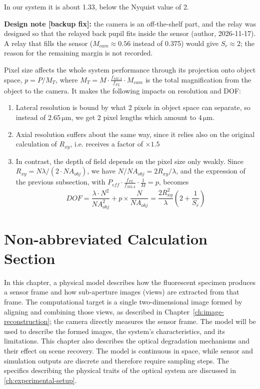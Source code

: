 In our system it is about 1.33, below the Nyquist value of 2.

\textbf{Design note [backup fix]: } the camera is an off-the-shelf part, and the relay was designed so that the relayed back pupil fits inside the sensor (author, 2026-11-17). A relay that fills the sensor ($M_{cam}\approx 0.56$ instead of 0.375) would give $S_r\approx 2$; the reason for the remaining margin is not recorded.

Pixel size affects the whole system performance through its projection onto object space, $p=P/M_T$, where $M_T=M\cdot\frac{f_{MLA}}{f_{FL}}\cdot M_{cam}$ is the total magnification from the object to the camera. It makes the following impacts on resolution and DOF:
\begin{enumerate}
    \item Lateral resolution is bound by what 2 pixels in object space can separate, so instead of $2.65\,\mathrm{\mu m}$, we get 2 pixel lengths which amount to $4\,\mathrm{\mu m}$.
    \item Axial resolution suffers about the same way, since it relies also on the original calculation of $R_{xy}$, i.e. receives a factor of $\times 1.5$
    \item In contrast, the depth of field depends on the pixel size only weakly. Since $R_{xy}=N\lambda/(2\cdot NA_{obj})$, we have $N/NA_{obj}=2R_{xy}/\lambda$, and the expression of the previous subsection, with $P_{eff}\cdot\frac{f_{FL}}{f_{MLA}}\cdot\frac{1}{M}=p$, becomes
    \begin{equation}
        DOF=\frac{\lambda\cdot N^2}{NA_{obj}^2}+p\times\frac{N}{NA_{obj}}=\frac{2R_{xy}^2}{\lambda}\left(2+\frac{1}{S_r}\right)
    \end{equation}
\end{enumerate}

\section{Non-abbreviated Calculation Section}
In this chapter, a physical model describes how the fluorescent specimen produces a sensor frame and how sub-aperture images (views) are extracted from that frame.
The computational target is a single two-dimensional image formed by aligning and combining those views, as described in Chapter~\ref{ch:image-reconstruction}; the camera directly measures the sensor frame.
The model will be used to describe the formed images, the system's characteristics, and its limitations.
This chapter also describes the optical degradation mechanisms and their effect on scene recovery.
The model is continuous in space, while sensor and simulation outputs are discrete and therefore require sampling steps.
The specifics describing the physical traits of the optical system are discussed in \cref{ch:experimental-setup}.

